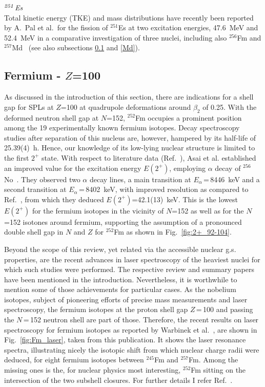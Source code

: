 {\it $^{\it251}$Es}\\ 
Total kinetic energy (TKE) and mass distributions have recently been reported by A.~Pal et al.~for the fission of $^{251}$Es at two excitation energies, 47.6~MeV and 52.4~MeV in a comparative investigation of three nuclei, including also $^{256}$Fm and $^{257}$Md~\cite{Pal2021} (see also subsections \ref{Fm} and \ref{Md}).\\


\subsection{Fermium - $Z$=100}\label{Fm}

As discussed in the introduction of this section, there are indications for a shell gap for SPLs at $Z$=100 at quadrupole deformations around $\beta_2$ of 0.25. 
With the deformed neutron shell gap at $N$=152, $^{252}$Fm occupies a prominent position among the 19 experimentally known fermium isotopes. 
Decay spectroscopy studies after separation of this nucleus are, however, hampered by its half-life of 25.39(4)~h. 
Hence, our knowledge of its low-lying nuclear structure is limited to the first $2^+$ state.
With respect to literature data (Ref.~\cite{Hoffman1990}), Asai et al. established an improved value for the excitation energy $E(2^+)$, employing $\alpha$ decay of $^{256}$No~\cite{Asai2016}.
They observed two $\alpha$ decay lines, a main transition at $E_\alpha$\,=\,8446~keV and a second transition at $E_\alpha$\,=\,8402~keV, with improved resolution as compared to Ref.~\cite{Hoffman1990}, from which they deduced $E(2^+)$=42.1(13)~keV. 
This is the lowest $E(2^+)$ for the fermium isotopes in the vicinity of $N$=152 as well as for the $N$=152 isotones around fermium, supporting the assumption of a pronounced double shell gap in $N$ and $Z$ for $^{252}$Fm as shown in Fig.~\ref{fig:2+_92-104}.

Beyond the scope of this review, yet related via the accessible nuclear g.s. properties, are the recent advances in laser spectroscopy of the heaviest nuclei for which such studies were performed. 
The respective review and summary papers have been mentioned in the introduction.
Nevertheless, it is worthwhile to mention some of those achievements for particular cases.
As the nobelium isotopes, subject of pioneering efforts of precise mass measurements and laser spectroscopy, the fermium isotopes at the proton shell gap $Z$\,=\,100 and passing the $N$\,=\,152 neutron shell are part of those.
Therefore, the recent results on laser spectroscopy for fermium isotopes as reported by Warbinek et al.~\cite{Warbinek2024}, are shown in Fig.~\ref{fig:Fm_laser}, taken from this publication. 
It shows the laser resonance spectra, illustrating nicely the isotopic shift from which nuclear charge radii were deduced, for eight fermium isotopes between $^{245}$Fm and $^{257}$Fm.
Among the missing ones is the, for nuclear physics most interesting, $^{252}$Fm sitting on the intersection of the two subshell closures.
For further details I refer Ref.~\cite{Warbinek2024}.\\

